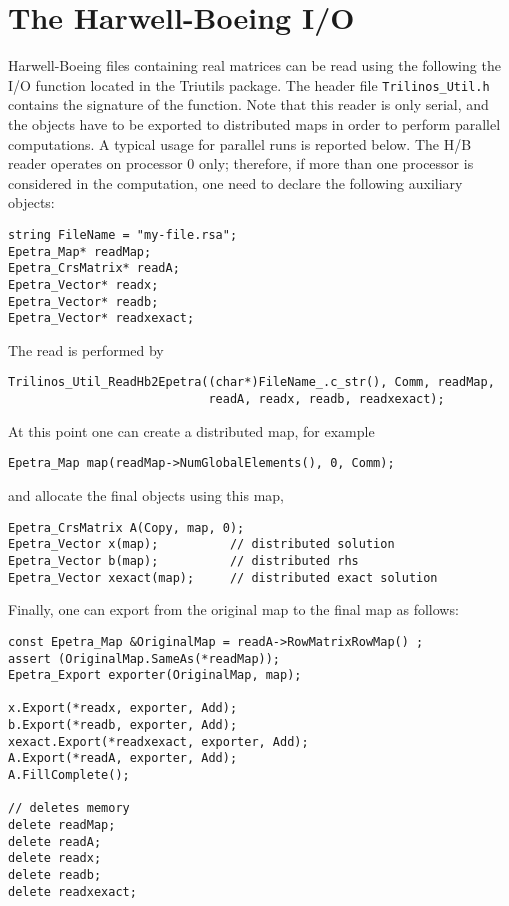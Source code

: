 \documentclass[11pt,relax]{SANDreport}
\begin{document}
\section{The Harwell-Boeing I/O}
\label{sec:hb}

Harwell-Boeing files containing real matrices can be read using the following
the I/O function located in the Triutils package. The header file
\verb!Trilinos_Util.h! contains the signature of the function. Note that this
reader is only serial, and the objects have to be exported to distributed maps
in order to perform parallel computations. A typical usage for parallel runs
is reported below. The H/B reader operates on processor 0 only; therefore, if
more than one processor is considered in the computation, one need to declare
the following auxiliary objects:
\begin{verbatim}
string FileName = "my-file.rsa";
Epetra_Map* readMap;
Epetra_CrsMatrix* readA; 
Epetra_Vector* readx; 
Epetra_Vector* readb;
Epetra_Vector* readxexact;
\end{verbatim}
The read is performed by
\begin{verbatim}
Trilinos_Util_ReadHb2Epetra((char*)FileName_.c_str(), Comm, readMap,
                            readA, readx, readb, readxexact);
\end{verbatim}
At this point one can create a distributed map, for example
\begin{verbatim}
Epetra_Map map(readMap->NumGlobalElements(), 0, Comm);
\end{verbatim}
and allocate the final objects using this map,
\begin{verbatim}
Epetra_CrsMatrix A(Copy, map, 0);
Epetra_Vector x(map);          // distributed solution
Epetra_Vector b(map);          // distributed rhs
Epetra_Vector xexact(map);     // distributed exact solution
\end{verbatim}
Finally, one can export from the original map to the final map as follows:
\begin{verbatim}
const Epetra_Map &OriginalMap = readA->RowMatrixRowMap() ; 
assert (OriginalMap.SameAs(*readMap)); 
Epetra_Export exporter(OriginalMap, map);

x.Export(*readx, exporter, Add);
b.Export(*readb, exporter, Add);
xexact.Export(*readxexact, exporter, Add);
A.Export(*readA, exporter, Add);
A.FillComplete();
    
// deletes memory
delete readMap;
delete readA; 
delete readx; 
delete readb;
delete readxexact;
\end{verbatim}
\end{document}
